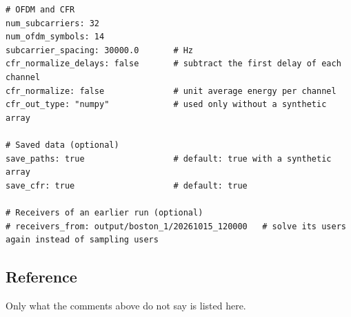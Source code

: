 \documentclass{article}
\begin{document}
\begin{verbatim}
# OFDM and CFR
num_subcarriers: 32
num_ofdm_symbols: 14
subcarrier_spacing: 30000.0       # Hz
cfr_normalize_delays: false       # subtract the first delay of each channel
cfr_normalize: false              # unit average energy per channel
cfr_out_type: "numpy"             # used only without a synthetic array

# Saved data (optional)
save_paths: true                  # default: true with a synthetic array
save_cfr: true                    # default: true

# Receivers of an earlier run (optional)
# receivers_from: output/boston_1/20261015_120000   # solve its users again instead of sampling users
\end{verbatim}

\subsection{Reference}
Only what the comments above do not say is listed here.
\end{document}
